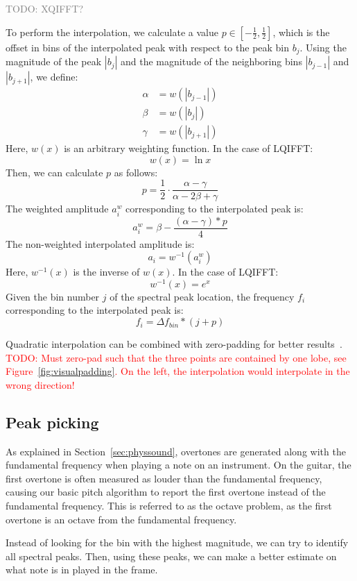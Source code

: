 \documentclass[10pt,twocolumn]{article}
\begin{document}
\textcolor{gray}{TODO: XQIFFT?}

To perform the interpolation, we calculate a value $p \in [-\frac{1}{2}, \frac{1}{2}]$, which is the offset in bins of the interpolated peak with respect to the peak bin $b_j$. Using the magnitude of the peak $|b_j|$ and the magnitude of the neighboring bins $|b_{j - 1}|$ and $|b_{j + 1}|$, we define:
\begin{align*}
    \alpha &= w(|b_{j - 1}|) \\
    \beta  &= w(|b_{j}|) \\
    \gamma &= w(|b_{j + 1}|)
\end{align*}
Here, $w(x)$ is an arbitrary weighting function. In the case of LQIFFT:
\[ w(x) = \ln{x} \]
Then, we can calculate $p$ as follows:
\[ p = \frac{1}{2} \cdot \frac{\alpha - \gamma}{\alpha - 2\beta + \gamma} \]
The weighted amplitude $a_i^w$ corresponding to the interpolated peak is:
\[ a_i^w = \beta - \frac{(\alpha - \gamma) * p}{4} \]
The non-weighted interpolated amplitude is:
\[ a_i = w^{-1}(a_i^w) \]
Here, $w^{-1}(x)$ is the inverse of $w(x)$. In the case of LQIFFT:
\[ w^{-1}(x) = e^{x} \]
Given the bin number $j$ of the spectral peak location, the frequency $f_i$ corresponding to the interpolated peak is:
\[ f_i = \Delta f_{bin} * (j + p) \]

Quadratic interpolation can be combined with zero-padding for better results~\cite{interpolnozero}.
\textcolor{red}{TODO: Must zero-pad such that the three points are contained by one lobe, see Figure~\ref{fig:visualpadding}. On the left, the interpolation would interpolate in the wrong direction!}


\subsection{Peak picking}
As explained in Section~\ref{sec:physsound}, overtones are generated along with the fundamental frequency when playing a note on an instrument. On the guitar, the first overtone is often measured as louder than the fundamental frequency, causing our basic pitch algorithm to report the first overtone instead of the fundamental frequency. This is referred to as the octave problem, as the first overtone is an octave from the fundamental frequency.

Instead of looking for the bin with the highest magnitude, we can try to identify all spectral peaks. Then, using these peaks, we can make a better estimate on what note is in played in the frame.
\end{document}
